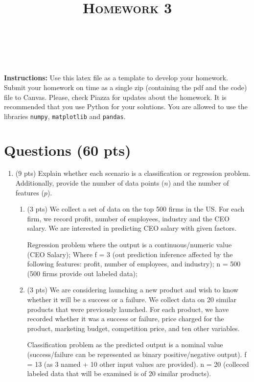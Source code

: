 \documentclass[a4paper]{article}
\title{\textsc{Homework 3}} %
\author{
\red{NAME} \\
\red{\#}\\
}
\date{}
\theoremstyle{definition}
\newenvironment{soln}{
    \leavevmode\color{blue}\ignorespaces
}{}
\begin{document}
\maketitle


\textbf{Instructions:}
Use this latex file as a template to develop your homework.
Submit your homework on time as a single zip (containing the pdf and the code) file to Canvas. Please, check Piazza for updates about the homework. It is recommended that you use Python for your solutions. You are allowed to use the libraries {\tt numpy}, {\tt matplotlib} and {\tt pandas}.
\section{Questions (60 pts)}
\begin{enumerate}
  \item (9 pts) Explain whether each scenario is a classification or regression problem. Additionally, provide the number of data points ($n$) and the number of features ($p$).

        \begin{enumerate}
          \item (3 pts) We collect a set of data on the top 500 firms in the US. For each firm, we record profit, number of employees, industry and the CEO salary. We are interested in predicting CEO salary with given factors.

                \begin{soln}  Regression problem where the output is a continuous/numeric value (CEO Salary); Where f = 3 (out prediction inference affected by the following features: profit, number of employees, and industry); n = 500 (500 firms provide out labeled data);  \end{soln}

          \item (3 pts) We are considering launching a new product and wish to know whether it will be a success or a failure. We collect data on 20 similar products that were previously launched. For each product, we have recorded whether it was a success or failure, price charged for the product, marketing budget, competition price, and ten other variables.

                \begin{soln}  Classification problem as the predicted output is a nominal value (success/failure can be represented as binary positive/negative output). f = 13 (as 3 named + 10 other input values are provided). n = 20 (colleced labeled data that will be examined is of 20 similar products).  \end{soln}


\end{enumerate}
\end{enumerate}
\end{document}
